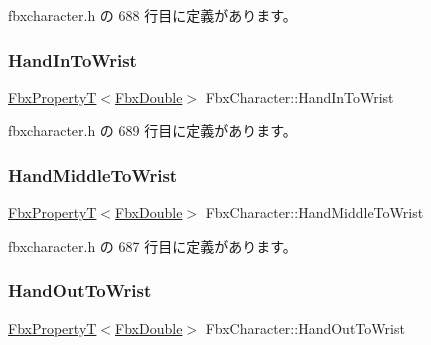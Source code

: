  fbxcharacter.\+h の 688 行目に定義があります。

\mbox{\label{class_fbx_character_a1c2c2abe75a505a4dbaa7a303d44d0a5}} 
\subsubsection{\texorpdfstring{Hand\+In\+To\+Wrist}{HandInToWrist}}
{\footnotesize\ttfamily \hyperlink{class_fbx_property_t}{Fbx\+PropertyT}$<$\hyperlink{fbxtypes_8h_a171e72a1c46fc15c1a6c9c31948c1c5b}{Fbx\+Double}$>$ Fbx\+Character\+::\+Hand\+In\+To\+Wrist}



 fbxcharacter.\+h の 689 行目に定義があります。

\mbox{\label{class_fbx_character_a30e904ae4d83a0ee4bdd5ad67085ebb4}} 
\subsubsection{\texorpdfstring{Hand\+Middle\+To\+Wrist}{HandMiddleToWrist}}
{\footnotesize\ttfamily \hyperlink{class_fbx_property_t}{Fbx\+PropertyT}$<$\hyperlink{fbxtypes_8h_a171e72a1c46fc15c1a6c9c31948c1c5b}{Fbx\+Double}$>$ Fbx\+Character\+::\+Hand\+Middle\+To\+Wrist}



 fbxcharacter.\+h の 687 行目に定義があります。

\mbox{\label{class_fbx_character_a8d6319089637fd340baeead343320f79}} 
\subsubsection{\texorpdfstring{Hand\+Out\+To\+Wrist}{HandOutToWrist}}
{\footnotesize\ttfamily \hyperlink{class_fbx_property_t}{Fbx\+PropertyT}$<$\hyperlink{fbxtypes_8h_a171e72a1c46fc15c1a6c9c31948c1c5b}{Fbx\+Double}$>$ Fbx\+Character\+::\+Hand\+Out\+To\+Wrist}



